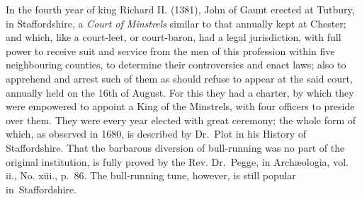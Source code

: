 In the fourth year of king Richard II. (1381), John of Gaunt erected at
Tutbury, in Staffordshire, a \textit{Court of Minstrels} similar to that annually kept at
Chester; and which, like a court-leet, or court-baron, had a legal jurisdiction,
with full power to receive suit and service from the men of this profession within
five neighbouring counties, to determine their controversies and enact laws; also
to apprehend and arrest such of them as should refuse to appear at the said court,
annually held on the 16th of August. For this they had a charter, by which
they were empowered to appoint a King of the Minstrels, with four officers to
preside over them. They were every year elected with great ceremony; the
whole form of which, as observed in 1680, is described by Dr.~Plot in his History
of Staffordshire. That the barbarous diversion of bull-running was no part of the
original institution, is fully proved by the Rev. Dr.~Pegge, in Archæologia, vol. ii.,
No. xiii., p.~86. The bull-running tune, however, is still popular in~Staffordshire. 

\pagebreak
